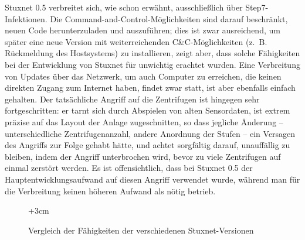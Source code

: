 \documentclass[a4paper]{article}
\begin{document}
Stuxnet 0.5 verbreitet sich, wie schon erwähnt, ausschließlich über Step7-Infektionen.
Die Command-and-Control-Möglichkeiten sind darauf beschränkt, neuen Code herunterzuladen und auszuführen;
dies ist zwar ausreichend, um später eine neue Version mit weiterreichenden C\&C-Möglichkeiten (z.~B. Rück\-mel\-dung des Hostsystems) zu installieren,
zeigt aber, dass solche Fähigkeiten bei der Entwicklung von Stuxnet für unwichtig erachtet wurden.
Eine Verbreitung von Updates über das Netzwerk, um auch Computer zu erreichen, die keinen direkten Zugang zum Internet haben,
findet zwar statt, ist aber ebenfalls einfach gehalten.
Der tatsächliche Angriff auf die Zentrifugen ist hingegen sehr fortgeschritten:
er tarnt sich durch Abspielen von alten Sensordaten,
ist extrem präzise auf das Layout der Anlage zugeschnitten, so dass jegliche Änderung – unterschiedliche Zentrifugenanzahl, andere Anordnung der Stufen – ein Versagen des Angriffs zur Folge gehabt hätte,
und achtet sorgfältig darauf, unauffällig zu bleiben, indem der Angriff unterbrochen wird, bevor zu viele Zentrifugen auf einmal zerstört werden.
Es ist offensichtlich, dass bei Stuxnet 0.5 der Hauptentwicklungsaufwand auf diesen Angriff verwendet wurde,
während man für die Verbreitung keinen höheren Aufwand als nötig betrieb.

\begin{figure}
  \begin{adjustwidth}{-3cm}{+3cm}
  \end{adjustwidth}
  \caption{Vergleich der Fähigkeiten der verschiedenen Stuxnet-Versionen\label{fig:vergleich}}
\end{figure}
\end{document}
